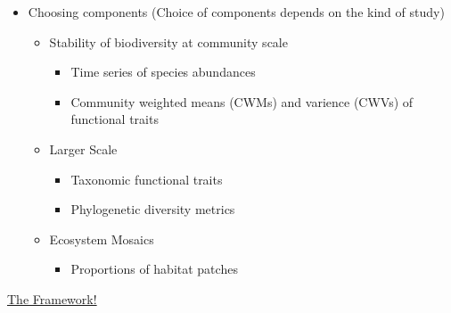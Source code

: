 \documentclass[11pt]{article}
\begin{document}
\begin{itemize}
\begin{itemize}
		\end{itemize} 
		\item Choosing components (Choice of components depends on the kind of study)
		\begin{itemize}
			\item Stability of biodiversity at community scale
			\begin{itemize}
				\item Time series of species abundances
				\item Community weighted means (CWMs) and varience (CWVs) of functional traits
			\end{itemize}
			\item Larger Scale
			\begin{itemize}
				\item Taxonomic functional traits
				\item Phylogenetic diversity metrics
			\end{itemize}
			\item Ecosystem Mosaics
			\begin{itemize}
				\item Proportions of habitat patches
			\end{itemize}
		\end{itemize}
	\end{itemize}
	\underline{The Framework!}
\end{document}
